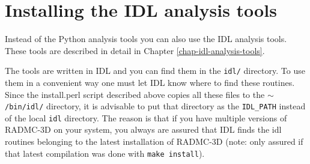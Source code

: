 \documentclass{report}
\begin{document}
\section{Installing the IDL analysis tools}
\label{sec-install-idlscripts}
%
Instead of the Python analysis tools you can also use the IDL analysis
tools.  These tools are described in detail in Chapter
\ref{chap-idl-analysis-tools}.

The tools are written in IDL and you can find them in the {\small\tt idl/}
directory. To use them in a convenient way one must let IDL know where to
find these routines. Since the install.perl script described above copies
all these files to the $\sim${\small\tt /bin/idl/} directory, it is
advisable to put that directory as the {\small\tt IDL\_PATH} instead of the local
{\small\tt idl} directory.  The reason is that if you have multiple versions
of RADMC-3D on your system, you always are assured that IDL finds the idl
routines belonging to the latest installation of RADMC-3D (note: only
assured if that latest compilation was done with {\small\tt make install}).
\end{document}
